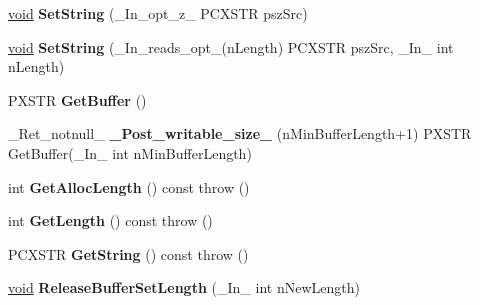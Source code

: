 \begin{DoxyCompactItemize}
\item 
\mbox{\label{class_a_t_l_1_1_c_simple_string_t_acadb968025e5adc1aa517bb92476c310}} 
\hyperlink{interfacevoid}{void} {\bfseries Set\+String} (\+\_\+\+In\+\_\+opt\+\_\+z\+\_\+ P\+C\+X\+S\+TR psz\+Src)
\item 
\mbox{\label{class_a_t_l_1_1_c_simple_string_t_a3b5a95d95d75f3717e866a93963a429d}} 
\hyperlink{interfacevoid}{void} {\bfseries Set\+String} (\+\_\+\+In\+\_\+reads\+\_\+opt\+\_\+(n\+Length) P\+C\+X\+S\+TR psz\+Src, \+\_\+\+In\+\_\+ int n\+Length)
\item 
\mbox{\label{class_a_t_l_1_1_c_simple_string_t_ab309959b9e89e3b0040523d759ca0e0f}} 
P\+X\+S\+TR {\bfseries Get\+Buffer} ()
\item 
\mbox{\label{class_a_t_l_1_1_c_simple_string_t_a827c449bdf36bc00a094d7a8e8042f02}} 
\+\_\+\+Ret\+\_\+notnull\+\_\+ {\bfseries \+\_\+\+Post\+\_\+writable\+\_\+size\+\_\+} (n\+Min\+Buffer\+Length+1) P\+X\+S\+TR Get\+Buffer(\+\_\+\+In\+\_\+ int n\+Min\+Buffer\+Length)
\item 
\mbox{\label{class_a_t_l_1_1_c_simple_string_t_aa9438b48c989585f47798ce17899b85d}} 
int {\bfseries Get\+Alloc\+Length} () const  throw ()
\item 
\mbox{\label{class_a_t_l_1_1_c_simple_string_t_a659d4f3b4891d6b52e7027763a55edbc}} 
int {\bfseries Get\+Length} () const  throw ()
\item 
\mbox{\label{class_a_t_l_1_1_c_simple_string_t_ac8ed54f85ec170f2c1118ee9ba074bd1}} 
P\+C\+X\+S\+TR {\bfseries Get\+String} () const  throw ()
\item 
\mbox{\label{class_a_t_l_1_1_c_simple_string_t_a89128910e9461c85e9eb3b44fae2d1a9}} 
\hyperlink{interfacevoid}{void} {\bfseries Release\+Buffer\+Set\+Length} (\+\_\+\+In\+\_\+ int n\+New\+Length)
\item 
\mbox{\label{class_a_t_l_1_1_c_simple_string_t_acf38970078dfc6549adbb02666c7371e}} 

\end{DoxyCompactItemize}
